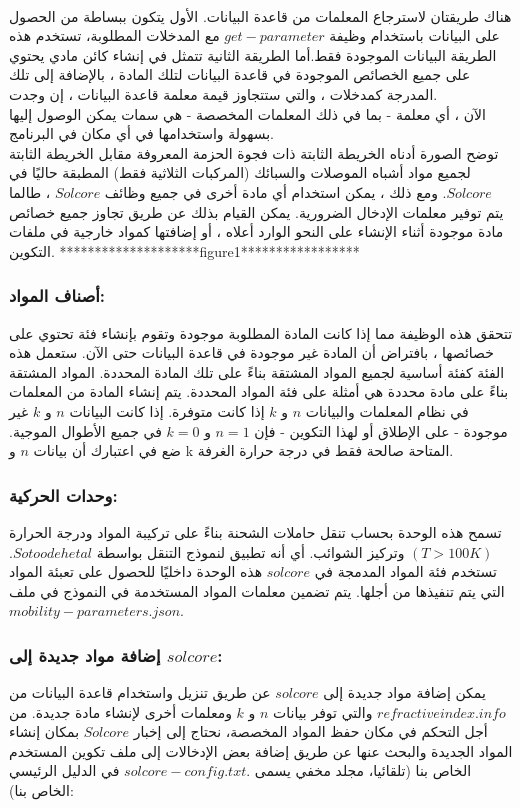 \\هناك طريقتان لاسترجاع المعلمات من قاعدة البيانات. الأول يتكون ببساطة من الحصول على البيانات باستخدام وظيفة $ get-parameter $ مع المدخلات المطلوبة، تستخدم هذه الطريقة البيانات الموجودة فقط.أما الطريقة الثانية تتمثل في إنشاء كائن مادي يحتوي على جميع الخصائص الموجودة في قاعدة البيانات لتلك المادة ، بالإضافة إلى تلك المدرجة كمدخلات ، والتي ستتجاوز قيمة معلمة قاعدة البيانات ، إن وجدت.
\\
الآن ، أي معلمة - بما في ذلك المعلمات المخصصة - هي سمات يمكن الوصول إليها بسهولة واستخدامها في أي مكان في البرنامج.
\\
توضح الصورة أدناه الخريطة الثابتة ذات فجوة الحزمة المعروفة مقابل الخريطة الثابتة لجميع مواد أشباه الموصلات والسبائك (المركبات الثلاثية فقط) المطبقة حاليًا في $ Solcore $. ومع ذلك ، يمكن استخدام أي مادة أخرى في جميع وظائف $ Solcore $ ، طالما يتم توفير معلمات الإدخال الضرورية. يمكن القيام بذلك عن طريق تجاوز جميع خصائص مادة موجودة أثناء الإنشاء على النحو الوارد أعلاه ، أو إضافتها كمواد خارجية في ملفات التكوين.
********************figure1*****************

\subsubsection{أصناف المواد:}
تتحقق هذه الوظيفة مما إذا كانت المادة المطلوبة موجودة وتقوم بإنشاء فئة تحتوي على خصائصها ، بافتراض أن المادة غير موجودة في قاعدة البيانات حتى الآن.
ستعمل هذه الفئة كفئة أساسية لجميع المواد المشتقة بناءً على تلك المادة المحددة.
المواد المشتقة بناءً على مادة محددة هي أمثلة على فئة المواد المحددة.
يتم إنشاء المادة من المعلمات في نظام المعلمات والبيانات $ n $ و $ k $ إذا كانت متوفرة. إذا كانت البيانات $ n $ و $ k $ غير موجودة - على الإطلاق أو لهذا التكوين - فإن $ n = 1 $ و $ k = 0 $ في جميع الأطوال الموجية. ضع في اعتبارك أن بيانات $ n $ و k المتاحة صالحة فقط في درجة حرارة الغرفة.
\subsubsection{وحدات الحركية:}

تسمح هذه الوحدة بحساب تنقل حاملات الشحنة بناءً على تركيبة المواد ودرجة الحرارة$  (T> 100K) $ وتركيز الشوائب. أي أنه تطبيق لنموذج التنقل بواسطة $ Sotoodeh et al $. تستخدم فئة المواد المدمجة في $ solcore $ هذه الوحدة داخليًا للحصول على تعبئة المواد التي يتم تنفيذها من أجلها.
يتم تضمين معلمات المواد المستخدمة في النموذج في ملف $ mobility-parameters.json $.

\subsubsection{إضافة مواد جديدة إلى $ solcore $:}
يمكن إضافة مواد جديدة إلى $ solcore $ عن طريق تنزيل  واستخدام قاعدة البيانات من $ refractiveindex.info $ والتي توفر بيانات $ n $ و $ k $ ومعلمات أخرى لإنشاء مادة جديدة.
من أجل التحكم في مكان حفظ المواد المخصصة، نحتاج إلى إخبار $ Solcore $ بمكان إنشاء المواد الجديدة والبحث عنها عن طريق إضافة بعض الإدخالات إلى ملف تكوين المستخدم الخاص بنا (تلقائيا، مجلد مخفي يسمى .$ solcore-config.txt $ في الدليل الرئيسي الخاص بنا):

